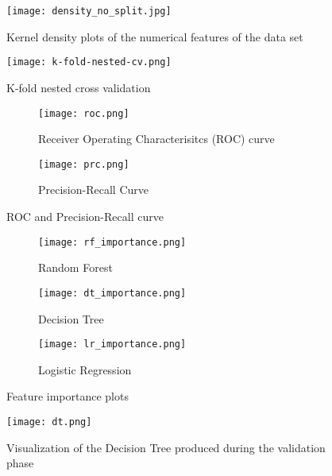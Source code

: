 \begin{figure}[ht]
    \centering
    \texttt{[image: density\_no\_split.jpg]}
    \caption{Kernel density plots of the numerical features of the data set}
    \label{fig:density}
\end{figure}
\begin{figure}[ht]
 \centering
 \texttt{[image: k-fold-nested-cv.png]}
 \caption{K-fold nested cross validation}
 \label{fig:cv}
\end{figure}
\begin{figure}
 \centering
 \begin{subfigure}{0.6\textwidth}
  \centering
  \texttt{[image: roc.png]}
  \caption{Receiver Operating Characterisitcs (ROC) curve}
  \label{fig:roc}
 \end{subfigure}
 \begin{subfigure}{0.6\textwidth}
  \centering
  \texttt{[image: prc.png]}
  \caption{Precision-Recall Curve}
  \label{fig:prc}
 \end{subfigure}
 \caption{ROC and Precision-Recall curve}
 \label{fig:prc-roc}
\end{figure}

\begin{figure}
 \begin{subfigure}{0.5\textwidth}
  \texttt{[image: rf\_importance.png]}
  \caption{Random Forest}
  \label{fig:rf_importance}
 \end{subfigure}
 \begin{subfigure}{0.5\textwidth}
  \texttt{[image: dt\_importance.png]}
  \caption{Decision Tree}
  \label{fig:dt_importance}
 \end{subfigure}
 \begin{subfigure}{\textwidth}
 \centering
  \texttt{[image: lr\_importance.png]}
  \caption{Logistic Regression}
  \label{fig:lr_importance}
 \end{subfigure}
 \caption{Feature importance plots}
 \label{fig:feature-importance}
\end{figure}
\begin{figure}
 \texttt{[image: dt.png]}
 \caption{Visualization of the Decision Tree produced during the validation 
phase}
 \label{fig:dt}
\end{figure}


